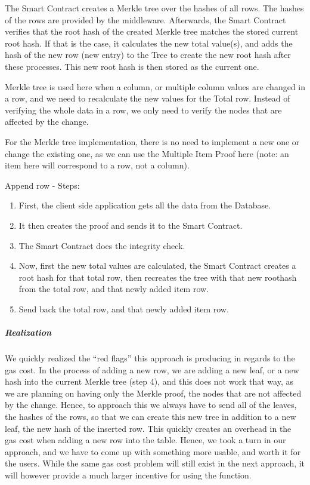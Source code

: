 The Smart Contract creates a Merkle tree over the hashes of all rows. The hashes of the rows are provided by the middleware. Afterwards, the Smart Contract verifies that the root hash of the created Merkle tree matches the stored current root hash. If that is the case, it calculates the new total value(s), and adds the hash of the new row (new entry) to the Tree to create the new root hash after these processes. This new root hash is then stored as the current one.

Merkle tree is used here when a column, or multiple column values are changed in a row, and we need to recalculate the new values for the Total row. Instead of verifying the whole data in a row, we only need to verify the nodes that are affected by the change.

For the Merkle tree implementation, there is no need to implement a new one or change the existing one, as we can use the Multiple Item Proof here (note: an item here will correspond to a row, not a column).

Append row - Steps:
\begin{enumerate}
\item First, the client side application gets all the data from the Database.
\item It then creates the proof and sends it to the Smart Contract.
\item The Smart Contract does the integrity check.
\item Now, first the new total values are calculated, the Smart Contract creates a root hash for that total row, then recreates the tree with that new roothash from the total row, and that newly added item row.
\item Send back the total row, and that newly added item row.
\end{enumerate}

\subparagraph{Realization}

We quickly realized the “red flags” this approach is producing in regards to the gas cost. In the process of adding a new row, we are adding a new leaf, or a new hash into the current Merkle tree (step 4), and this does not work that way, as we are planning on having only the Merkle proof, the nodes that are not affected by the change. Hence, to approach this we always have to send all of the leaves, the hashes of the rows, so that we can create this new tree in addition to a new leaf, the new hash of the inserted row. This quickly creates an overhead in the gas cost when adding a new row into the table. Hence, we took a turn in our approach, and we have to come up with something more usable, and worth it for the users. While the same gas cost problem will still exist in the next approach, it will however provide a much larger incentive for using the function.

